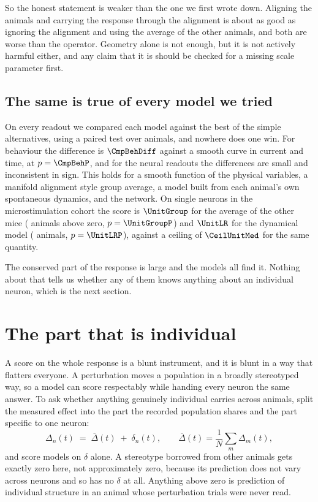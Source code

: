 \documentclass[11pt,letterpaper]{article}
\begin{document}
So the honest statement is weaker than the one we first wrote down. Aligning the animals
and carrying the response through the alignment is about as good as ignoring the
alignment and using the average of the other animals, and both are worse than the
operator. Geometry alone is not enough, but it is not actively harmful either, and any
claim that it is should be checked for a missing scale parameter first.

\subsection{The same is true of every model we tried}

On every readout we compared each model against the best of the simple alternatives,
using a paired test over animals, and nowhere does one win. For behaviour the
difference is $\CmpBehDiff$ against a smooth curve in current and time, at
$p = \CmpBehP$, and for the neural readouts the differences are small and inconsistent
in sign. This holds for a smooth function of the physical variables, a manifold
alignment style group average, a model built from each animal's own spontaneous
dynamics, and the network. On single neurons in the microstimulation cohort the score
is $\UnitGroup$ for the average of the other mice (\UnitGroupPos{} animals above zero,
$p = \UnitGroupP$) and $\UnitLR$ for the dynamical model (\UnitLRPos{} animals,
$p = \UnitLRP$), against a ceiling of $\CeilUnitMed$ for the same quantity.

The conserved part of the response is large and the models all find it. Nothing about
that tells us whether any of them knows anything about an individual neuron, which is
the next section.

\section{The part that is individual}
\label{sec:individual}

A score on the whole response is a blunt instrument, and it is blunt in a way that
flatters everyone. A perturbation moves a population in a broadly stereotyped way, so a
model can score respectably while handing every neuron the same answer. To ask whether
anything genuinely individual carries across animals, split the measured effect into
the part the recorded population shares and the part specific to one neuron:
\[
\Delta_n(t) \;=\; \overline{\Delta}(t) \;+\; \delta_n(t),
\qquad \overline{\Delta}(t) = \frac{1}{N}\sum_m \Delta_m(t),
\]
and score models on $\delta$ alone. A stereotype borrowed from other animals gets
exactly zero here, not approximately zero, because its prediction does not vary across
neurons and so has no $\delta$ at all. Anything above zero is prediction of individual
structure in an animal whose perturbation trials were never read.
\end{document}

